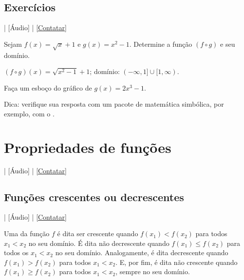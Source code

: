 \subsection*{Exercícios}

\begin{flushright}
  [Vídeo] | [Áudio] | \href{https://phkonzen.github.io/notas/contato.html}{[Contatar]}
\end{flushright}

\begin{exer}
  Sejam $f(x) = \sqrt{x}+1$ e $g(x) = x^2 -1$. Determine a função $(f\circ g)$ e seu domínio.
\end{exer}
\begin{resp}
  $(f\circ g)(x) = \sqrt{x^2-1}+1$; domínio: $(-\infty, 1]\cup [1, \infty)$.
\end{resp}

\begin{exer}
  Faça um esboço do gráfico de $g(x) = 2x^3 - 1$.
\end{exer}
\begin{resp}
  Dica: verifique sua resposta com um pacote de matemática simbólica, por exemplo, com o \sympy.
\end{resp}

\section{Propriedades de funções}\label{cap_funcao_sec_funprop}

\begin{flushright}
  [Vídeo] | [Áudio] | \href{https://phkonzen.github.io/notas/contato.html}{[Contatar]}
\end{flushright}

\subsection{Funções crescentes ou decrescentes}

\begin{flushright}
  [Vídeo] | [Áudio] | \href{https://phkonzen.github.io/notas/contato.html}{[Contatar]}
\end{flushright}

Uma da função $f$ é dita ser crescente quando $f(x_1)<f(x_2)$ para todos $x_1<x_2$ no seu domínio. É dita não decrescente quando $f(x_1)\leq f(x_2)$ para todos os $x_1<x_2$ no seu domínio. Analogamente, é dita decrescente quando $f(x_1)>f(x_2)$ para todos $x_1<x_2$. E, por fim, é dita não crescente quando $f(x_1)\geq f(x_2)$ para todos $x_1<x_2$, sempre no seu domínio.

